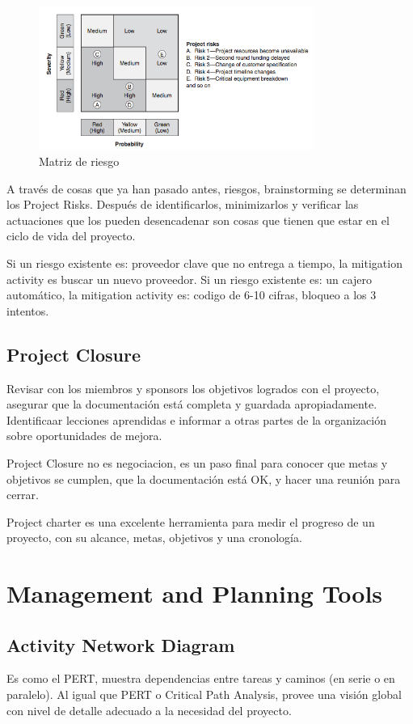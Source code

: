 \documentclass[]{article}
\begin{document}
\begin{figure}[ht!]
	\centering
	\includegraphics[width=90mm]{imagenes/RiskMatrix2.png}
	\caption{Matriz de riesgo}
	\label{fig:RiskMatrix2}
\end{figure}

A través de cosas que ya han pasado antes, riesgos, brainstorming se determinan los Project Risks. Después de identificarlos, minimizarlos y verificar las actuaciones que los pueden desencadenar son cosas que tienen que estar en el ciclo de vida del proyecto. 

Si un riesgo existente es: proveedor clave que no entrega a tiempo, la mitigation activity es buscar un nuevo proveedor.
Si un riesgo existente es: un cajero automático, la mitigation activity es: codigo de 6-10 cifras, bloqueo a los 3 intentos.

\subsection{Project Closure}

Revisar con los miembros y sponsors los objetivos logrados con el proyecto, asegurar que la documentación está completa y guardada apropiadamente. Identificaar lecciones aprendidas e informar a otras partes de la organización sobre oportunidades de mejora.

Project Closure no es negociacion, es un paso final para conocer que metas y objetivos se cumplen, que la documentación está OK, y hacer una reunión para cerrar.

Project charter es una excelente herramienta para medir el progreso de un proyecto, con su alcance, metas, objetivos y una cronología.

\section{Management and Planning Tools}

\subsection{Activity Network Diagram}
Es como el PERT, muestra dependencias entre tareas y caminos (en serie o en paralelo). Al igual que PERT o Critical Path Analysis, provee una visión global con nivel de detalle adecuado a la necesidad del proyecto.
\end{document}
